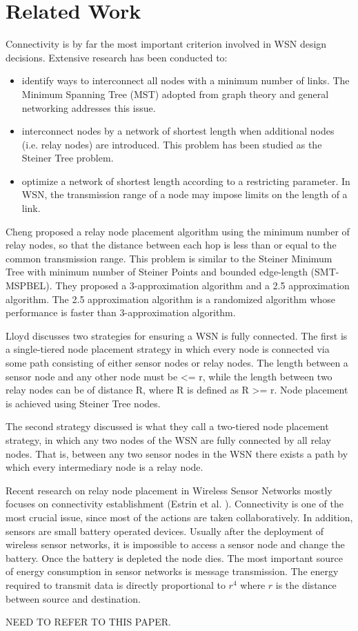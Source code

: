 \section{Related Work}\label{Related Work}

Connectivity is by far the most important criterion involved in WSN design decisions. Extensive research has been conducted to:
\begin{itemize}
\item identify ways to interconnect all nodes with a minimum number of links. The Minimum Spanning Tree (MST) adopted from graph theory and general networking addresses this issue.
\item interconnect nodes by a network of shortest length when additional nodes (i.e. relay nodes) are introduced. This problem has been studied as the Steiner Tree problem.
\item optimize a network of shortest length according to a restricting parameter. In WSN, the transmission range of a node may impose limits on the length of a link.
\end{itemize}

Cheng \cite{RelaySensor} proposed a relay node placement algorithm using the minimum number of relay nodes, so that the distance between each hop is less than or equal to the common transmission range. This problem is similar to the Steiner Minimum Tree with minimum number of Steiner Points and bounded edge-length (SMT-MSPBEL). They proposed a 3-approximation algorithm and a 2.5 approximation algorithm. The 2.5 approximation algorithm is a randomized algorithm whose performance is faster than 3-approximation algorithm.

Lloyd \cite{1191701} discusses two strategies for ensuring a WSN is fully connected.  The first is a single-tiered node placement strategy in which every node is connected via some path consisting of either sensor nodes or relay nodes.  The length between a sensor node and any other node must be <= r, while the length between two relay nodes can be of distance R, where R is defined as R >= r.  Node placement is achieved using Steiner Tree nodes.

The second strategy discussed is what they call a two-tiered node placement strategy, in which any two nodes of the WSN are fully connected by all relay nodes. That is, between any two sensor nodes in the WSN there exists a path by which every intermediary node is a relay node.

Recent research on relay node placement in Wireless Sensor Networks mostly focuses on connectivity establishment (Estrin et al. \cite{940390}). Connectivity is one of the most crucial issue, since most of the actions are taken collaboratively. In addition, sensors are small battery operated devices. Usually after the deployment of wireless sensor networks, it is impossible to access a sensor node and change the battery. Once the battery is depleted the node dies. The most important source of energy consumption in sensor networks is message transmission. The energy required to transmit data is directly proportional to $r^4$ where $r$ is the distance between source and destination.

NEED TO REFER TO THIS PAPER\cite{596303}.